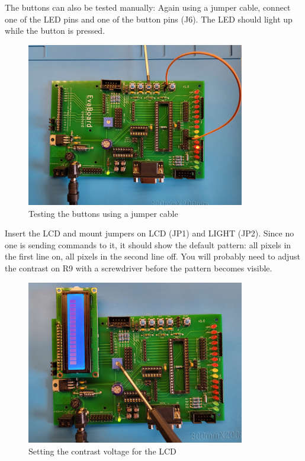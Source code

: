 \documentclass{article}
\begin{document}
The buttons can also be tested manually: Again using a jumper cable, connect one of the LED pins and one of the button pins (J6). The LED should light up while the button is pressed. 
\begin{figure}[htb]
\centering
\includegraphics[width=0.85\textwidth]{Pictures/Testing4.jpg}
\caption{Testing the buttons using a jumper cable}
\label{fig:testing4}
\end{figure}

Insert the LCD and mount jumpers on LCD (JP1) and LIGHT (JP2). Since no one is sending commands to it, it should show the default pattern: all pixels in the first line on, all pixels in the second line off. You will probably need to adjust the contrast on R9 with a screwdriver before the pattern becomes visible. 
\begin{figure}[htb]
\centering
\includegraphics[width=0.85\textwidth]{Pictures/Testing5.jpg}
\caption{Setting the contrast voltage for the LCD}
\label{fig:testing5}
\end{figure}
\end{document}
